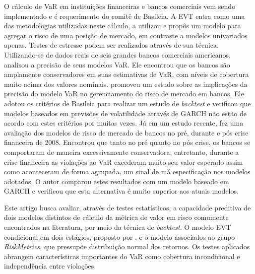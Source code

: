 \documentclass[1p]{elsarticle}
\theoremstyle{definition}
\begin{document}

O cálculo de VaR em instituições financeiras e bancos comerciais vem sendo implementado e é requerimento do comitê de Basileia. A EVT entra como uma das metodologias utilizadas neste cálculo,  \cite{Longin2000} a utilizou e propôs um modelo para agregar o risco de uma posição de mercado, em contraste a modelos univariados apenas. Testes de estresse podem ser realizados através de sua técnica. Utilizando-se de dados reais de seis grandes bancos comerciais americanos, \cite{Berkowitz2002} analisou a precisão de seus modelos VaR. Ele encontrou que os bancos são amplamente conservadores em suas estimativas de VaR, com níveis de cobertura muito acima dos valores nominais. \cite{Wong2003} promoveu um estudo sobre as implicações da precisão do modelo VaR no gerenciamento do risco de mercado em bancos. Ele adotou os critérios de Basileia para realizar um estudo de \emph{backtest} e verificou que modelos baseados em previsões de volatilidade através de GARCH não estão de acordo com estes critérios por muitas vezes. Já em um estudo recente, \cite{OBrien2017} fez uma avaliação dos modelos de risco de mercado de bancos no pré, durante e pós crise financeira de 2008. Encontrou que tanto no pré quanto no pós crise, os bancos se comportaram de maneira excessivamente conservadora, entretanto, durante a crise financeira as violações ao VaR excederam muito seu valor esperado assim como aconteceram de forma agrupada, um sinal de má especificação nos modelos adotados. O autor comparou estes resultados com um modelo baseado em GARCH e verificou que esta alternativa é muito superior aos atuais modelos.

Este artigo busca avaliar, através de testes estatísticos, a capacidade preditiva de dois modelos distintos de cálculo da métrica de valor em risco comumente encontrados na literatura, por meio da técnica de \emph{backtest}. O modelo EVT condicional em dois estágios, proposto por \cite{McNeil2000}, e o modelo associados ao grupo \emph{RiskMetrics}, que pressupõe distribuição normal dos retornos. Os testes aplicados abrangem características importantes do VaR como cobertura incondicional e independência entre violações.
\end{document}
